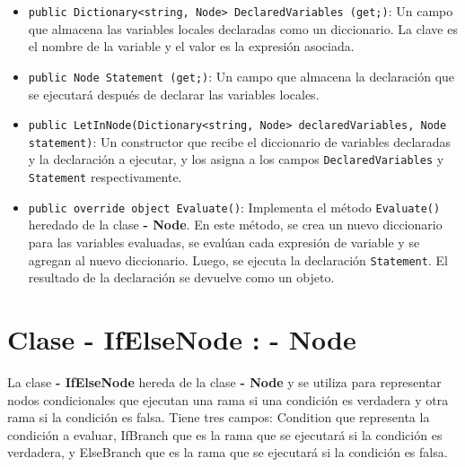 \documentclass{article}
\newcommand{\subclassed}[1]{\textcolor{classcolor}{\textbf{- #1}}}
\begin{document}
\begin{itemize}
    \item \lstinline{public Dictionary<string, Node> DeclaredVariables (get;)}: Un campo que almacena las variables locales declaradas como un diccionario. La clave es el nombre de la variable y el valor es la expresión asociada.

    \item \lstinline{public Node Statement (get;)}: Un campo que almacena la declaración que se ejecutará después de declarar las variables locales.

    \item \lstinline{public LetInNode(Dictionary<string, Node> declaredVariables, Node statement)}: Un constructor que recibe el diccionario de variables declaradas y la declaración a ejecutar, y los asigna a los campos \lstinline{DeclaredVariables} y \lstinline{Statement} respectivamente.

    \item \lstinline{public override object Evaluate()}: Implementa el método \lstinline{Evaluate()} heredado de la clase \subclassed{Node}. En este método, se crea un nuevo diccionario para las variables evaluadas, se evalúan cada expresión de variable y se agregan al nuevo diccionario. Luego, se ejecuta la declaración \lstinline{Statement}. El resultado de la declaración se devuelve como un objeto.
\end{itemize}
\section{Clase \subclassed{IfElseNode} : \subclassed{Node}}

La clase \subclassed{IfElseNode} hereda de la clase \subclassed{Node} y se utiliza para representar nodos condicionales que ejecutan una rama si una condición es verdadera y otra rama si la condición es falsa. Tiene tres campos: \textcolor{fieldcolor}{Condition} que representa la condición a evaluar, \textcolor{fieldcolor}{IfBranch} que es la rama que se ejecutará si la condición es verdadera, y \textcolor{fieldcolor}{ElseBranch} que es la rama que se ejecutará si la condición es falsa.
\end{document}
